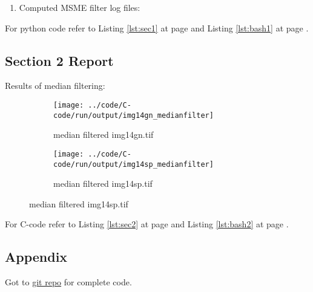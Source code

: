 \documentclass[a4paper,11pt]{article}
\newcommand{\reflst}[1]{Listing \ref{#1} at page \pageref{#1}}
\begin{document}
\begin{enumerate}
\clearpage
\item Computed MSME filter log files:



\end{enumerate}

For python code refer to \reflst{lst:sec1} and \reflst{lst:bash1}.

\clearpage
\subsection*{Section 2 Report} 
Results of median filtering:

\begin{figure}[!hp]
  \centering
 \begin{subfigure}{0.45\textwidth}
  \texttt{[image: ../code/C-code/run/output/img14gn\_medianfilter]}
 \caption{median filtered img14gn.tif}
 \end{subfigure}
 \begin{subfigure}{0.45\textwidth}
  \texttt{[image: ../code/C-code/run/output/img14sp\_medianfilter]}
 \caption{median filtered img14sp.tif}
 \end{subfigure}  
 \end{figure}
 
For C-code refer to \reflst{lst:sec2} and \reflst{lst:bash2}.


\clearpage
\subsection*{Appendix}
Got to \href{https://github.com/rahuldeshmukh43/Courses/tree/master/ECE637-DigitalImageProcessing-I/labs/lab7/code/}{git repo} for complete code.




\end{document}
